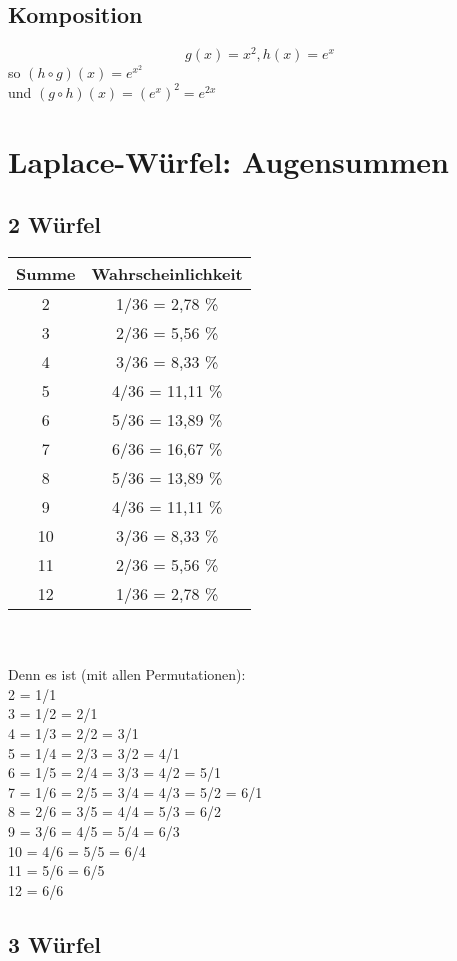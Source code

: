 \documentclass{article}
\begin{document}
\subsection{Komposition}
\begin{equation}
g(x) = x^2, h(x) = e^x
\end{equation}
so $(h \circ g)(x) = e^{x^2}$\\
und $(g \circ h)(x) = \left(e^x\right)^2 = e^{2x}$

\newpage
\section{Laplace-Würfel: Augensummen}
\subsection{2 Würfel}
\begin{tabular}{c | c}
Summe & Wahrscheinlichkeit \\
\hline
2 & 1/36 = 2,78 \% \\
3 & 2/36 = 5,56 \%\\
4 & 3/36 = 8,33 \%\\
5 & 4/36 = 11,11 \%\\
6 & 5/36 = 13,89 \%\\
7 & 6/36 = 16,67 \%\\
8 & 5/36 = 13,89 \%\\
9 & 4/36 = 11,11 \%\\
10 & 3/36 = 8,33 \%\\
11 & 2/36 = 5,56 \%\\
12 & 1/36 = 2,78 \%
\end{tabular}
 \\\\
Denn es ist (mit allen Permutationen):\\
2 = 1/1\\
3 = 1/2 = 2/1\\
4 = 1/3 = 2/2 = 3/1\\
5 = 1/4 = 2/3 = 3/2 = 4/1\\
6 = 1/5 = 2/4 = 3/3 = 4/2 = 5/1\\
7 = 1/6 = 2/5 = 3/4 = 4/3 = 5/2 = 6/1\\
8 = 2/6 = 3/5 = 4/4 = 5/3 = 6/2\\
9 = 3/6 = 4/5 = 5/4 = 6/3\\
10 = 4/6 = 5/5 = 6/4\\
11 = 5/6 = 6/5\\
12 = 6/6

\subsection{3 Würfel}
\end{document}
